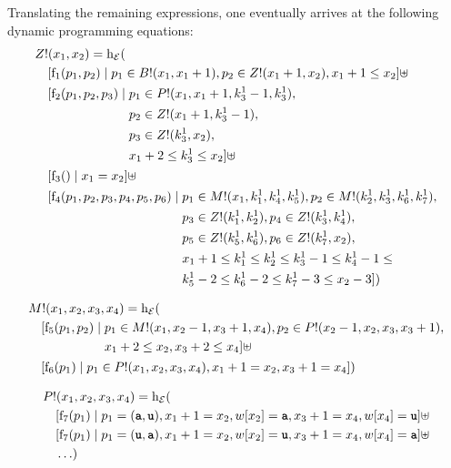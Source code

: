 \documentclass[
    a4paper,
    12pt,
    twoside,
    BCOR=12mm,
    parskip=half,
    chapterprefix,
    numbers=noenddot,
    bibliography=totoc
]{scrbook}
\begin{document}
Translating the remaining expressions, one eventually arrives at the following dynamic programming equations:	
\begin{align*}
  &Z!(x_1,x_2) = \mathrm{h}_\mathcal{E}( \nonumber\\
  &\quad [ \mathrm{f}_1(p_1,p_2) \mid p_1 \in B!(x_1,x_1+1), p_2 \in Z!(x_1+1,x_2), x_1 + 1 \leq x_2 ] \uplus \\
  &\quad \!\begin{aligned}[t]
    [ \mathrm{f}_2(p_1,p_2,p_3) \mid \;
    &p_1 \in P!(x_1,x_1+1,k^1_3-1,k^1_3),\\
    &p_2 \in Z!(x_1+1,k^1_3-1),\\
    &p_3 \in Z!(k^1_3,x_2),\\
    &x_1 + 2 \leq k^1_3 \leq x_2] \uplus
    \end{aligned} \\
  &\quad [ \mathrm{f}_3() \mid x_1 = x_2 ] \uplus \nonumber\\
  &\quad \!\begin{aligned}[t]
    [ \mathrm{f}_4(p_1,p_2,p_3,p_4,p_5,p_6) \mid \;
    &p_1 \in M!(x_1,k^1_1,k^1_4,k^1_5), p_2 \in M!(k^1_2,k^1_3,k^1_6,k^1_7),\\
    &p_3 \in Z!(k^1_1,k^1_2), p_4 \in Z!(k^1_3,k^1_4),\\
    &p_5 \in Z!(k^1_5,k^1_6), p_6 \in Z!(k^1_7,x_2),\\
    &x_1+1 \leq k^1_1 \leq k^1_2 \leq k^1_3 - 1 \leq k^1_4 - 1 \leq\\
    &k^1_5 - 2 \leq k^1_6 - 2 \leq k^1_7 - 3 \leq x_2 - 3
    ] )
    \end{aligned}		
\end{align*}

\begin{align*}
  &M!(x_1,x_2,x_3,x_4) = \mathrm{h}_\mathcal{E}( \\
  &\quad \!\begin{aligned}[t]
    [ \mathrm{f}_5(p_1,p_2) \mid \; &p_1 \in M!(x_1,x_2-1,x_3+1,x_4), p_2 \in P!(x_2-1,x_2,x_3,x_3+1),\\
    &x_1 + 2 \leq x_2, x_3 + 2 \leq x_4
    ] \uplus
    \end{aligned} \\
  &\quad [ \mathrm{f}_6(p_1) \mid p_1 \in P!(x_1,x_2,x_3,x_4), x_1 + 1 = x_2, x_3 + 1 = x_4 ] 
  )
\end{align*}

\begin{align*}
  &P!(x_1,x_2,x_3,x_4) = \op{h}_\mathcal{E}( \\
  &\quad  [ \op{f}_7(p_1) \mid p_1 = (\ts{a},\ts{u}), x_1+1 = x_2, w[x_2] = \ts{a}, x_3+1 = x_4, w[x_4] = \ts{u} ] \uplus \\
  &\quad  [ \op{f}_7(p_1) \mid p_1 = (\ts{u},\ts{a}), x_1+1 = x_2, w[x_2] = \ts{u}, x_3+1 = x_4, w[x_4] = \ts{a} ] \uplus \\
  &\quad  \ldots)
\end{align*}
\end{document}
